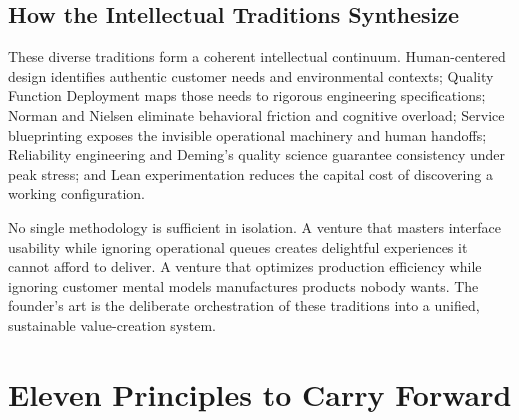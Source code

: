 \subsection*{How the Intellectual Traditions Synthesize}

These diverse traditions form a coherent intellectual continuum. Human-centered design identifies authentic customer needs and environmental contexts; Quality Function Deployment maps those needs to rigorous engineering specifications; Norman and Nielsen eliminate behavioral friction and cognitive overload; Service blueprinting exposes the invisible operational machinery and human handoffs; Reliability engineering and Deming's quality science guarantee consistency under peak stress; and Lean experimentation reduces the capital cost of discovering a working configuration.

No single methodology is sufficient in isolation. A venture that masters interface usability while ignoring operational queues creates delightful experiences it cannot afford to deliver. A venture that optimizes production efficiency while ignoring customer mental models manufactures products nobody wants. The founder's art is the deliberate orchestration of these traditions into a unified, sustainable value-creation system.

\section*{Eleven Principles to Carry Forward}

